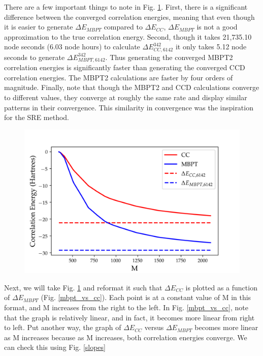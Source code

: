 There are a few important things to note in Fig. \ref{mbpt_and_cc}.  First, there is a significant difference between the converged correlation energies, meaning that even though it is easier to generate $\Delta E_{MBPT}$ compared to $\Delta E_{CC}$, $\Delta E_{MBPT}$ is not a good approximation to the true correlation energy. Second, though it takes 21,735.10 node seconds (6.03 node hours) to calculate $\Delta E_{CC,6142}^{342}$ it only takes 5.12 node seconds to generate $\Delta E_{MBPT,6142}^{342}$.  Thus generating the converged MBPT2 correlation energies is significantly faster than generating the converged CCD correlation energies. The MBPT2 calculations are faster by four orders of magnitude. Finally, note that though the MBPT2 and CCD calculations converge to different values, they converge at roughly the same rate and display similar patterns in their convergence. This similarity in convergence was the inspiration for the SRE method.

\begin{figure}
    \includegraphics[scale=0.75]{Images/Chapter7/ElectronGas/MBPT_and_CC.png}
    \label{mbpt_and_cc}
\end{figure}

Next, we will take Fig. \ref{mbpt_and_cc} and reformat it such that $\Delta E_{CC}$ is plotted as a function of $\Delta E_{MBPT}$ (Fig. \ref{mbpt_vs_cc}).  Each point is at a constant value of M in this format, and M increases from the right to the left. In Fig. \ref{mbpt_vs_cc}, note that the graph is relatively linear, and in fact, it becomes more linear from right to left. Put another way, the graph of $\Delta E_{CC}$ versus $\Delta E_{MBPT}$ becomes more linear as M increases because as M increases, both correlation energies converge. We can check this using Fig. \ref{slopes}

